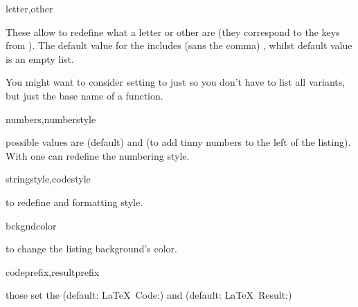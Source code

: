 \documentclass{article}
\begin{document}
\begin{codedescribe}[key,new=2025-05-13]{letter,other}
\begin{codesyntax} %
\end{codesyntax}
These allow to redefine what a letter or other are (they correspond to the  keys from ). The default value for the  includes (sans the comma)  , whilst  default value is an empty list.\\
\end{codedescribe}
\begin{tsremark}
  You might want to consider setting  to just  so you don't have to list all variants, but just the base name of a function.
\end{tsremark}

\begin{codedescribe}[key]{numbers,numberstyle}
\begin{codesyntax} %
\end{codesyntax}
 possible values are  (default) and  (to add tinny numbers to the left of the listing). With  one can redefine the numbering style.\\
\end{codedescribe}

\begin{codedescribe}[key]{stringstyle,codestyle}
\begin{codesyntax} %
\end{codesyntax}
to redefine  and  formatting style.\\
\end{codedescribe}

\begin{codedescribe}[key]{bckgndcolor}
\begin{codesyntax} %
\end{codesyntax}
to change the listing background's color.\\
\end{codedescribe}

\begin{codedescribe}[key]{codeprefix,resultprefix}
\begin{codesyntax} %
\end{codesyntax}
those set the  (default: \LaTeX~Code:) and  (default: \LaTeX~Result:)
\end{codedescribe}
\end{document}
